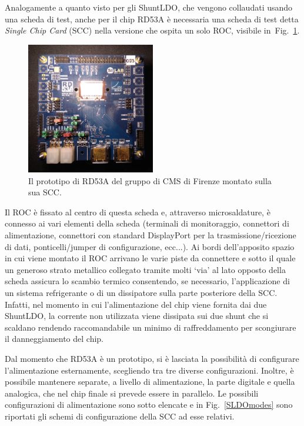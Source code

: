 Analogamente a quanto visto per gli ShuntLDO, che vengono collaudati usando una scheda di test, anche per il chip RD53A è necessaria una scheda di test detta \textit{Single Chip Card} (SCC) nella versione che ospita un solo ROC, visibile in~Fig.~\ref{fig:RD53onSCC}. 
\begin{figure}[t]
\centering
\includegraphics[width=0.5\textwidth]{Immagini/RD53onSCC.jpg}
\caption{Il prototipo di RD53A del gruppo di CMS di Firenze montato sulla sua SCC.}
\label{fig:RD53onSCC}
\end{figure}
Il ROC è fissato al centro di questa scheda e, attraverso microsaldature, è connesso ai vari elementi della scheda (terminali di monitoraggio, connettori di alimentazione, connettori con standard DisplayPort per la trasmissione/ricezione di dati, ponticelli/jumper di configurazione, ecc...). 
Ai bordi dell'apposito spazio in cui viene montato il ROC arrivano le varie piste da connettere e sotto il quale un generoso strato metallico collegato tramite molti `via' al lato opposto della scheda assicura lo scambio termico consentendo, se necessario, l'applicazione di un sistema refrigerante o di un dissipatore sulla parte posteriore della SCC. 
Infatti, nel momento in cui l'alimentazione del chip viene fornita dai due ShuntLDO, la corrente non utilizzata viene dissipata sui due shunt che si scaldano rendendo raccomandabile un minimo di raffreddamento per scongiurare il danneggiamento del chip.

Dal momento che RD53A è un prototipo, si è lasciata la possibilità di configurare l'alimentazione esternamente, scegliendo tra tre diverse configurazioni.
Inoltre, è possibile mantenere separate, a livello di alimentazione, la parte digitale e quella analogica, che nel chip finale si prevede essere in parallelo. Le possibili configurazioni di alimentazione sono sotto elencate e in Fig.~\ref{SLDOmodes} sono riportati gli schemi di configurazione della SCC ad esse relativi.

